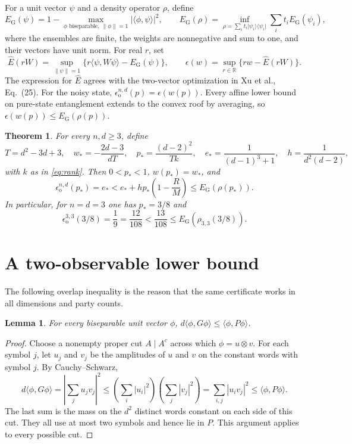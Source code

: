 \documentclass[11pt]{article}
\newtheorem{theorem}{Theorem}
\newtheorem{lemma}{Lemma}
\newcommand{\ket}[1]{\lvert #1\rangle}
\newcommand{\bra}[1]{\langle #1\rvert}
\newcommand{\EG}{E_{\mathrm G}}
\newcommand{\eps}{\epsilon_{\mathrm o}}
\begin{document}
For a unit vector $\psi$ and a density operator $\rho$, define
\[
 \EG(\psi)=1-\max_{\phi\text{ biseparable},\ \|\phi\|=1}
                   |\langle\phi,\psi\rangle|^2,\qquad
 \EG(\rho)=\inf_{\rho=\sum_i t_i\ket{\psi_i}\bra{\psi_i}}
                    \sum_i t_i\EG(\psi_i),
\]
where the ensembles are finite, the weights are nonnegative and sum to one,
and their vectors have unit norm. For real $r$, set
\[
 \widehat E(rW)=\sup_{\|\psi\|=1}\{r\langle\psi,W\psi\rangle-\EG(\psi)\},
 \qquad \epsilon(w)=\sup_{r\in\mathbb R}\{rw-\widehat E(rW)\}.
\]
The expression for $\widehat E$ agrees with the two-vector optimization
in Xu et al., Eq.~(25). For the noisy state, $\eps^{n,d}(p)=\epsilon(w(p))$.
Every affine lower bound on pure-state entanglement extends to the
convex roof by averaging, so $\epsilon(w(p))\leq\EG(\rho(p))$.

\begin{theorem}\label{thm:all}
For every $n,d\geq3$, define
\[
 T=d^2-3d+3,\quad
 w_*=-\frac{2d-3}{dT},\quad
 p_* =\frac{(d-2)^2}{Tk},\quad
 e_* =\frac1{(d-1)^3+1},\quad
 h=\frac1{d^2(d-2)},
\]
with $k$ as in \eqref{eq:rank}. Then $0<p_*<1$, $w(p_*)=w_*$, and
\begin{equation}\label{eq:gap}
 \eps^{n,d}(p_*)=e_* < e_*+h p_*\left(1-\frac RM\right)
                  \leq \EG(\rho(p_*)).
\end{equation}
In particular, for $n=d=3$ one has $p_*=3/8$ and
\begin{equation}\label{eq:qutrit}
 \eps^{3,3}(3/8)=\frac19=\frac{12}{108}
       <\frac{13}{108}\leq\EG(\rho_{3,3}(3/8)).
\end{equation}
\end{theorem}

\section{A two-observable lower bound}
The following overlap inequality is the reason that the same certificate
works in all dimensions and party counts.
\begin{lemma}\label{lem:cut}
For every biseparable unit vector $\phi$,
$d\langle\phi,G\phi\rangle\leq\langle\phi,P\phi\rangle$.
\end{lemma}
\begin{proof}
Choose a nonempty proper cut $A\mid A^c$ across which
$\phi=u\otimes v$. For each symbol $j$, let $u_j$ and $v_j$ be the
amplitudes of $u$ and $v$ on the constant words with symbol $j$.
By Cauchy--Schwarz,
\[
 d\langle\phi,G\phi\rangle
 =\left|\sum_j u_jv_j\right|^2
 \leq \left(\sum_i|u_i|^2\right)\left(\sum_j|v_j|^2\right)
 =\sum_{i,j}|u_iv_j|^2
 \leq\langle\phi,P\phi\rangle.
\]
The last sum is the mass on the $d^2$ distinct words constant on each
side of this cut. They all use at most two symbols and hence lie in $P$.
This argument applies to every possible cut.
\end{proof}
\end{document}
